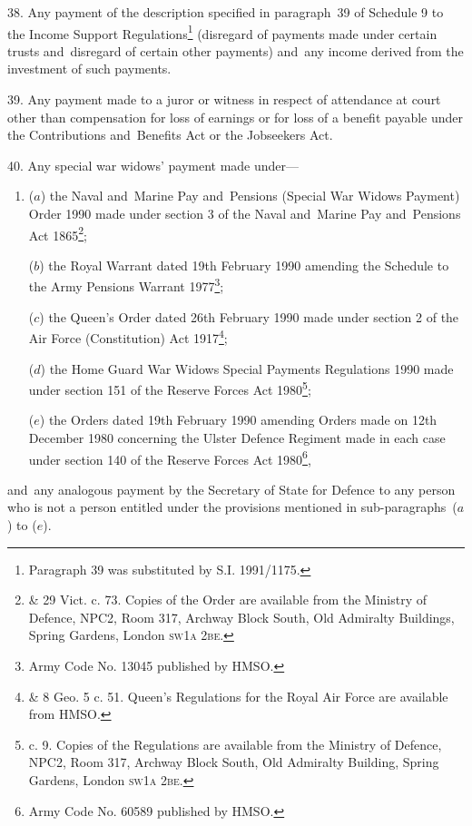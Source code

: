 \documentclass[12pt,a4paper]{article}
\begin{document}
\medskip

38.  Any payment of the description specified in paragraph~39 of Schedule 9 to the Income Support Regulations\footnote{\frenchspacing Paragraph 39 was substituted by S.I. 1991/1175.} (disregard of payments made under certain trusts and~disregard of certain other payments) and~any income derived from the investment of such payments.

\medskip

39.  Any payment made to a juror or witness in respect of attendance at court other than compensation for loss of earnings or for loss of a benefit payable under the Contributions and~Benefits Act
or the Jobseekers Act.  %


\medskip

40.  Any special war widows' payment made under—
\begin{enumerate}\item[]
($a$) the Naval and~Marine Pay and~Pensions (Special War Widows Payment) Order 1990 made under section 3 of the Naval and~Marine Pay and~Pensions Act 1865\footnote{ \& 29 Vict. c. 73. Copies of the Order are available from the Ministry of Defence, NPC2, Room 317, Archway Block South, Old Admiralty Buildings, Spring Gardens, London \textsc{\lowercase{SW1A 2BE}}.};

($b$) the Royal Warrant dated 19th February 1990 amending the Schedule to the Army Pensions Warrant 1977\footnote{\frenchspacing Army Code No. 13045 published by HMSO.};

($c$) the Queen’s Order dated 26th February 1990 made under section 2 of the Air Force (Constitution) Act 1917\footnote{ \& 8 Geo. 5 c. 51. Queen’s Regulations for the Royal Air Force are available from HMSO.};

($d$) the Home Guard War Widows Special Payments Regulations 1990 made under section 151 of the Reserve Forces Act 1980\footnote{ c. 9. Copies of the Regulations are available from the Ministry of Defence, NPC2, Room 317, Archway Block South, Old Admiralty Building, Spring Gardens, London \textsc{\lowercase{SW1A 2BE}}.};

($e$) the Orders dated 19th February 1990 amending Orders made on 12th December 1980 concerning the Ulster Defence Regiment made in each case under section 140 of the Reserve Forces Act 1980\footnote{\frenchspacing Army Code No. 60589 published by HMSO.},
\end{enumerate}
and~any analogous payment by the Secretary of State for Defence to any person who is not a person entitled under the provisions mentioned in sub-paragraphs~($a$) to ($e$).
\end{document}
